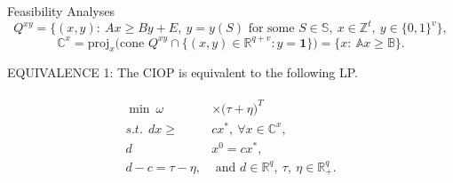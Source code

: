 \documentclass[14pt]{beamer}
\newcommand{\R}{\mathbb{R}}
\begin{document}
\begin{frame}{Feasibility Analyses}
\footnotesize
$$Q^{xy} = \bigg\{(x,y):~Ax \geq By+E, ~y = y(S) \text{ for some } S \in \mathbb{S}, ~x \in \mathbb{Z}^t, ~y \in \{0,1\}^v\bigg\},$$
$$\mathbb{C}^x = \text{proj}_x \bigg(\text{cone~}Q^{xy} \cap \big\{(x,y) \in \R^{q+v}: y = \textbf{1}\big\}\bigg) = \bigg\{x:~\mathbb{A}x \geq \mathbb{B}\bigg\}.$$
\begin{lemma}\label{lemma:equivalence1}
\centering
\small
EQUIVALENCE 1: The CIOP is equivalent to the following LP.
\end{lemma}
\vspace{-5mm}
\begin{small}
\begin{eqnarray*}\label{eqn:colp}
\begin{aligned}
\min ~\omega &\times \big(\tau + \eta\big)^T\\
s.t.~~dx \geq& cx^*,~\forall x \in \mathbb{C}^x,\\
d&x^0 = cx^*,\\
d-c = \tau - \eta, &\mbox{ and } d \in \R^{q}, ~\tau, ~\eta \in \R^{q}_+.
\end{aligned}
\end{eqnarray*}
\end{small}
\end{frame}
\end{document}
